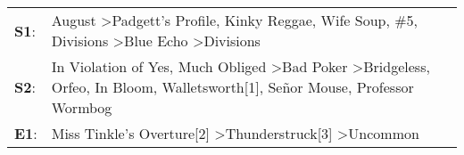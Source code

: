 \begin{supertabular}{p{0.03\textwidth}p{0.92\textwidth}}
 \textbf{S1}:  &                                                   August\textsuperscript{} \textgreater \enspace Padgett's Profile\textsuperscript{}, \enspace Kinky Reggae\textsuperscript{}, \enspace Wife Soup\textsuperscript{}, \enspace \#5\textsuperscript{}, \enspace Divisions\textsuperscript{} \textgreater \enspace Blue Echo\textsuperscript{} \textgreater \enspace Divisions\textsuperscript{}  \enspace  \\
 \textbf{S2}:  &  In Violation of Yes\textsuperscript{}, \enspace Much Obliged\textsuperscript{} \textgreater \enspace Bad Poker\textsuperscript{} \textgreater \enspace Bridgeless\textsuperscript{}, \enspace Orfeo\textsuperscript{}, \enspace In Bloom\textsuperscript{}, \enspace Walletsworth[1]\textsuperscript{}, \enspace Señor Mouse\textsuperscript{}, \enspace Professor Wormbog\textsuperscript{}  \enspace  \\
 \textbf{E1}:  &                                                                                                                                                                                                                                         Miss Tinkle's Overture[2]\textsuperscript{} \textgreater \enspace Thunderstruck[3]\textsuperscript{} \textgreater \enspace Uncommon\textsuperscript{}  \enspace  \\
\end{supertabular}
